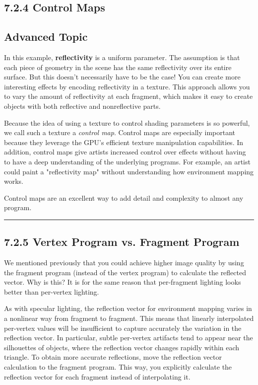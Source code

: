 \documentclass[../main.tex]{subfiles}
\begin{document}
\subsection{7.2.4 Control Maps}

\subsection*{Advanced Topic}

In this example, \textbf{reflectivity} is a uniform parameter. The assumption is that each piece of geometry in the scene has the same reflectivity over its entire surface. But this doesn't necessarily have to be the case! You can create more interesting effects by encoding reflectivity in a texture. This approach allows you to vary the amount of reflectivity at each fragment, which makes it easy to create objects with both reflective and nonreflective parts.

Because the idea of using a texture to control shading parameters is so powerful, we call such a texture a \textit{control map}. Control maps are especially important because they leverage the GPU's efficient texture manipulation capabilities. In addition, control maps give artists increased control over effects without having to have a deep understanding of the underlying programs. For example, an artist could paint a "reflectivity map" without understanding how environment mapping works.

Control maps are an excellent way to add detail and complexity to almost any program.
\hrule

\subsection{7.2.5 Vertex Program vs. Fragment Program}

We mentioned previously that you could achieve higher image quality by using the fragment program (instead of the vertex program) to calculate the reflected vector. Why is this? It is for the same reason that per-fragment lighting looks better than per-vertex lighting.

As with specular lighting, the reflection vector for environment mapping varies in a nonlinear way from fragment to fragment. This means that linearly interpolated per-vertex values will be insufficient to capture accurately the variation in the reflection vector. In particular, subtle per-vertex artifacts tend to appear near the silhouettes of objects, where the reflection vector changes rapidly within each triangle. To obtain more accurate reflections, move the reflection vector calculation to the fragment program. This way, you explicitly calculate the reflection vector for each fragment instead of interpolating it.
\end{document}
